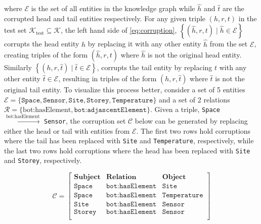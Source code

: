 \noindent where \( \mathcal{E} \) is the set of all entities in the knowledge graph while \( \hat{h} \) and \( \hat{t} \) are the corrupted head and tail entities respectively. For any given triple \( (h, r, t) \) in the test set $\mathcal{K}_{\text{test}} \subseteq \mathcal{K}$, the left hand side of \autoref{eq:corruption}, $\left\{(\hat{h}, r, t) \mid \hat{h} \in \mathcal{E}\right\}$ corrupts the head entity \( h \) by replacing it with any other entity \( \hat{h} \) from the set \( \mathcal{E} \), creating triples of the form \( (\hat{h}, r, t) \) where \( \hat{h} \) is not the original head entity. Similarly $\left\{(h, r, \hat{t}) \mid \hat{t} \in \mathcal{E}\right\}$, corrupts the tail entity by replacing \( t \) with any other entity \(\hat{t} \in \mathcal{E}\), resulting in triples of the form \( (h, r, \hat{t}) \) where \( \hat{t} \) is not the original tail entity. To visualize this process better, consider a set of 5 entities \( \mathcal{E} = \{ \texttt{Space}, \texttt{Sensor}, \texttt{Site}, \texttt{Storey}, \texttt{Temperature} \} \) and a set of 2 relations \( \mathcal{R} = \{ \text{bot:hasElement}, \texttt{bot:adjascentElement} \} \). Given a triple, \texttt{Space} $\xrightarrow{\text{bot:hasElement}}$ \texttt{Sensor}, the corruption set \( \mathcal{C} \) below can be generated by replacing either the head or tail with entities from \( \mathcal{E} \). The first two rows hold corruptions where the tail has been replaced with \texttt{Site} and \texttt{Temperature}, respectively, while the last two rows hold corruptions where the head has been replaced with \texttt{Site} and \texttt{Storey}, respectively. 

\[
\mathcal{C} = 
\left[\begin{array}{ccc}

\textbf{Subject} & \textbf{Relation} & \textbf{Object} \\
\hline
\texttt{Space} & \texttt{bot:hasElement} & \texttt{Site} \\ 
\texttt{Space} & \texttt{bot:hasElement} & \texttt{Temperature} \\ 
\texttt{Site} & \texttt{bot:hasElement} & \texttt{Sensor} \\ 
\texttt{Storey} & \texttt{bot:hasElement} & \texttt{Sensor} \\ 
\end{array}\right]
\]

